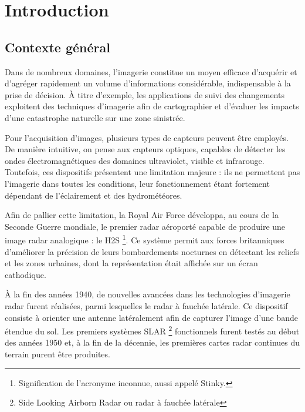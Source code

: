 \section{Introduction}\label{SEC:introdcution}
\subsection{Contexte général}
Dans de nombreux domaines, l’imagerie constitue un moyen efficace d’acquérir et d’agréger rapidement un volume d’informations considérable, indispensable à la prise de décision. À titre d’exemple, les applications de suivi des changements exploitent des techniques d’imagerie afin de cartographier et d’évaluer les impacts d’une catastrophe naturelle sur une zone sinistrée. 

Pour l’acquisition d’images, plusieurs types de capteurs peuvent être employés. De manière intuitive, on pense aux capteurs optiques, capables de détecter les ondes électromagnétiques des domaines ultraviolet, visible et infrarouge. Toutefois, ces dispositifs présentent une limitation majeure : ils ne permettent pas l’imagerie dans toutes les conditions, leur fonctionnement étant fortement dépendant de l’éclairement et des hydrométéores. 

Afin de pallier cette limitation, la Royal Air Force développa, au cours de la Seconde Guerre mondiale, le premier radar aéroporté capable de produire une image radar analogique : le H2S \footnote{Signification de l'acronyme inconnue, aussi appelé Stinky.}. Ce système permit aux forces britanniques d’améliorer la précision de leurs bombardements nocturnes en détectant les reliefs et les zones urbaines, dont la représentation était affichée sur un écran cathodique. 

À la fin des années 1940, de nouvelles avancées dans les technologies d’imagerie radar furent réalisées, parmi lesquelles le radar à fauchée latérale. Ce dispositif consiste à orienter une antenne latéralement afin de capturer l’image d’une bande étendue du sol. Les premiers systèmes SLAR \footnote{Side Looking Airborn Radar ou radar à fauchée latérale} fonctionnels furent testés au début des années 1950 et, à la fin de la décennie, les premières cartes radar continues du terrain purent être produites.

